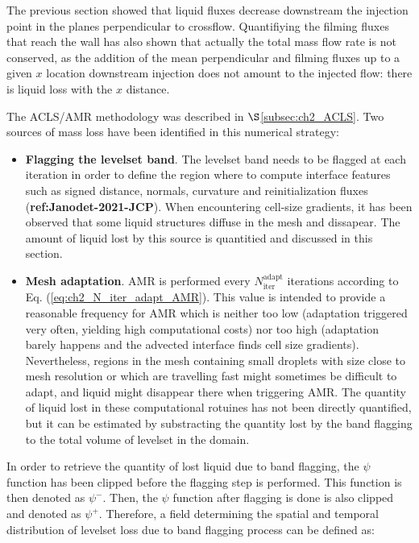 The previous section showed that liquid fluxes decrease downstream the injection point in the planes perpendicular to crossflow. Quantifiying the filming fluxes that reach the wall has also shown that actually the total mass flow rate is not conserved, as the addition of the mean perpendicular and filming fluxes up to a given $x$ location downstream injection does not amount to the injected flow: there is liquid loss with the $x$ distance.

The ACLS/AMR methodology was described in $\S$\ref{subsec:ch2_ACLS}. Two sources of mass loss have been identified in this numerical strategy: 

\begin{itemize}

	\item \textbf{Flagging the levelset band}. The levelset band needs to be flagged at each iteration in order to define the region where to compute interface features such as signed distance, normals, curvature and reinitialization fluxes (\textbf{ref:Janodet-2021-JCP}). When encountering cell-size gradients, it has been observed that some liquid structures diffuse in the mesh and dissapear. The amount of liquid lost by this source is quantitied and discussed in this section.
	
	\item \textbf{Mesh adaptation}. AMR is performed every $N_\mathrm{iter}^\mathrm{adapt}$ iterations according to Eq. (\ref{eq:ch2_N_iter_adapt_AMR}). This value is intended to provide a reasonable frequency for AMR which is neither too low (adaptation triggered very often, yielding high computational costs) nor too high (adaptation barely happens and the advected interface finds cell size gradients). Nevertheless, regions in the mesh containing small droplets with size close to mesh resolution or which are travelling fast might sometimes be difficult to adapt, and liquid might disappear there when triggering AMR. The quantity of liquid lost in these computational rotuines has not been directly quantified, but it can be estimated by substracting the quantity lost by the band flagging to the total volume of levelset in the domain.

\end{itemize}

In order to retrieve the quantity of lost liquid due to band flagging, the $\psi$ function has been clipped before the flagging step is performed. This function is then denoted as $\psi^-$. Then, the  $\psi$ function after flagging is done is also clipped and denoted as $\psi^+$. Therefore, a field determining the spatial and temporal distribution of levelset loss due to band flagging process can be defined as:

